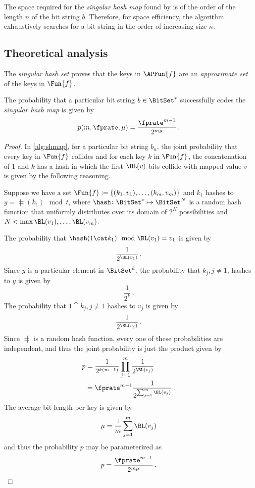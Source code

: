 \documentclass[ ../main.tex]{subfiles}
\begin{document}
The space required for the \emph{singular hash map} found by  is of the order of the length $n$ of the bit string $b$. Therefore, for space efficiency, the algorithm exhaustively searches for a bit string in the order of increasing size $n$.

\subsection{Theoretical analysis}
The \emph{singular hash set} proves that the keys in $\APFun{f}$ are an \emph{approximate set} of the keys in $\Fun{f}$.

\begin{theorem}
The probability that a particular bit string $b \in \BitSet^*$ successfully codes the \emph{singular hash map} is given by
\begin{equation}
    p(m,\fprate,\mu) = \frac{\fprate^{m-1}}{2^{m \mu}}\,.
\end{equation}
\end{theorem}
\begin{proof}
In \cref{alg:shmap}, for a particular bit string $b_n$, the joint probability that every key in $\Fun{f}$ collides and for each key $k$ in $\Fun{f}$, the concatenation of $1$ and $k$ has a hash in which the first $\BL(v)$ bits collide with mapped value $v$ is given by the following reasoning.

Suppose we have a set $\Fun{f} \coloneqq \{(k_1,v_1),\ldots,(k_m,v_m)\}$ and $k_1$ hashes to $y = \hash(k_1) \mod t$, where $\hash \colon \BitSet^* \mapsto \BitSet^N$ is a random hash function that uniformly distributes over its domain of $2^N$ possibilities and $N < \max{\BL(v_1),\ldots,\BL(v_m)}$.

The probability that $\hash(1 \cat k_1) \mod \BL(v_1) = v_1$ is given by
\begin{equation}
    \frac{1}{2^{\BL(v_1)}}\,.
\end{equation}
Since $y$ is a particular element in $\BitSet^k$, the probability that $k_j, j \neq 1$, hashes to $y$ is given by
\begin{equation}
    \frac{1}{2^k}\,.
\end{equation}
The probability that $1 \cat k_j, j \neq 1$ hashes to $v_j$ is given by
\begin{equation}
    \frac{1}{2^{\BL(v_j)}}\,.
\end{equation}
Since $\hash$ is a random hash function, every one of these probabilities are independent, and thus the joint probability is just the product given by
\begin{align}
    p &= \frac{1}{2^{k(m-1)}} \prod_{j=1}^{m} \frac{1}{2^{\BL(v_j)}}\\
      &= \fprate^{m-1} \frac{1}{2^{\sum_{j=1}^{m} \BL(v_j)}}\,.
\end{align}
The average bit length per key is given by
\begin{equation}
    \mu = \frac{1}{m} \sum_{j=1}^{m} \BL(v_j)
\end{equation}
and thus the probability $p$ may be parameterized as
\begin{equation}
    p = \frac{\fprate^{m-1}}{2^{m \mu}}\,.
\end{equation}
\end{proof}
\end{document}
